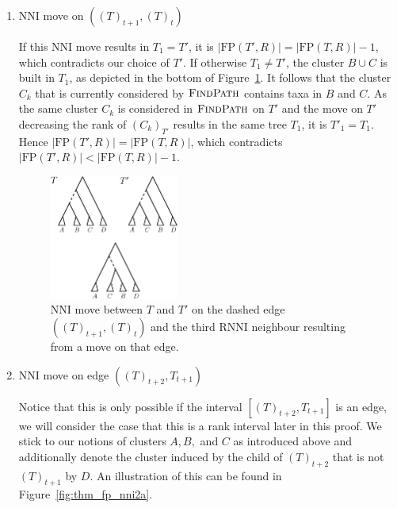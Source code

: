 \documentclass{amsart}
\newcommand{\rnni}{\mathrm{RNNI}}
\newcommand{\findpath}{\textsc{FindPath}}
\newcommand{\nni}{\mathrm{NNI}}
\newcommand{\fp}{\mathrm{FP}}
\begin{document}
\begin{enumerate}[label = 1.{\arabic*}]
\item $\nni$ move on $((T)_{t+1},(T)_t)$

If this $\nni$ move results in $T_1 = T'$, it is $|\fp(T',R)| = |\fp(T,R)| - 1$, which contradicts our choice of $T'$.
If otherwise $T_1 \neq T'$, the cluster $B \cup C$ is built in $T_1$, as depicted in the bottom of Figure~\ref{fig:thm_fp_nni1}.
It follows that the cluster $C_k$ that is currently considered by $\findpath$ contains taxa in $B$ and $C$.
As the same cluster $C_k$ is considered in $\findpath$ on $T'$
 and the move on $T'$ decreasing the rank of $(C_k)_{T'}$ results in the same tree $T_1$, it is $T'_1 = T_1$.
Hence $|\fp(T',R)| = |\fp(T,R)|$, which contradicts $|\fp(T',R)| < |\fp(T,R)| - 1$.

\begin{figure}[!hbt]
\centering
\includegraphics[width=0.4\textwidth]{thm_fp_nni1}
\vspace{12pt}
\caption{$\nni$ move between $T$ and $T'$ on the dashed edge $((T)_{t+1},(T)_t)$ and the third $\rnni$ neighbour resulting from a move on that edge.}
\label{fig:thm_fp_nni1}
\end{figure}

\item $\nni$ move on edge $((T)_{t+2},T_{t+1})$

Notice that this is only possible if the interval $[(T)_{t+2},T_{t+1}]$ is an edge, we will consider the case that this is a rank interval later in this proof.
We stick to our notions of clusters $A,B,$ and $C$ as introduced above and additionally denote the cluster induced by the child of $(T)_{t+2}$ that is not $(T)_{t+1}$ by $D$.
An illustration of this can be found in Figure~\ref{fig:thm_fp_nni2a}.


\end{enumerate}
\end{document}
